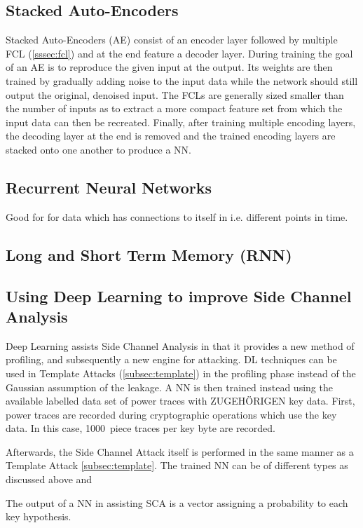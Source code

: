\documentclass[journal]{IEEEtran}
\begin{document}
\subsection{Stacked Auto-Encoders}
Stacked Auto-Encoders (AE) consist of an encoder layer followed by multiple FCL (\autoref{sssec:fcl}) and at the end feature a decoder layer. During training the goal of an AE is to reproduce the given input at the output. Its weights are then trained by gradually adding noise to the input data while the network should still output the original, denoised input. The FCLs are generally sized smaller than the number of inputs as to extract a more compact feature set from which the input data can then be recreated. Finally, after training multiple encoding layers, the decoding layer at the end is removed and the trained encoding layers are stacked onto one another to produce a NN. %

\subsection{Recurrent Neural Networks}
Good for for data which has connections to itself in i.e. different points in time.
\subsection{Long and Short Term Memory (RNN)}

\subsection{Using Deep Learning to improve Side Channel Analysis}
Deep Learning assists Side Channel Analysis in that it provides a new method of profiling, and subsequently a new engine for attacking. DL techniques can be used in Template Attacks (\autoref{subsec:template}) in the profiling phase instead of the Gaussian assumption of the leakage. A NN is then trained instead using the available labelled data set of power traces with ZUGEHÖRIGEN key data. First, power traces are recorded during cryptographic operations which use the key data. In this case, \SI{1000}{piece} traces per key byte are recorded. 

Afterwards, the Side Channel Attack itself is performed in the same manner as a Template Attack \autoref{subsec:template}. The trained NN can be of different types as discussed above and 

The output of a NN in assisting SCA is a vector assigning a probability to each key hypothesis. 
\end{document}

